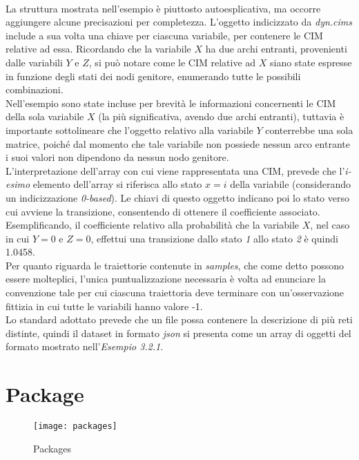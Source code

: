   \paragraph{}
  La struttura mostrata nell'esempio è piuttosto autoesplicativa, ma occorre aggiungere alcune precisazioni
  per completezza. L'oggetto indicizzato da \textit{dyn.cims} include a sua volta una chiave 
  per ciascuna variabile, per contenere le CIM relative ad essa. 
  Ricordando che la variabile $X$ ha due archi entranti, provenienti dalle variabili
  $Y$ e $Z$, si può notare come le CIM relative ad $X$ siano state espresse in funzione
  degli stati dei nodi genitore, enumerando tutte le possibili combinazioni.\\
  Nell'esempio sono state incluse per brevità le informazioni concernenti le CIM della sola
  variabile $X$ (la più significativa, avendo due archi entranti), tuttavia è importante sottolineare che l'oggetto 
  relativo alla variabile $Y$ conterrebbe una sola matrice, poiché dal momento che tale variabile non possiede nessun arco entrante
  i suoi valori non dipendono da nessun nodo genitore.\\
  L'interpretazione dell'array con cui viene rappresentata una CIM, prevede che
  l'\textit{i-esimo} elemento dell'array si riferisca allo stato $x = i$ della variabile (considerando 
  un indicizzazione \textit{0-based}). 
  Le chiavi di questo oggetto indicano poi lo stato verso cui avviene la transizione, 
  consentendo di ottenere il coefficiente associato.\\
  Esemplificando, il coefficiente relativo alla probabilità che la variabile $X$, nel caso in cui $Y=0$ e $Z=0$,
  effettui una transizione dallo stato \textit{1} allo stato \textit{2} è quindi 1.0458.\\
  Per quanto riguarda le traiettorie contenute in \textit{samples}, che come detto 
  possono essere molteplici, l'unica puntualizzazione necessaria è volta ad enunciare la convenzione tale per cui
  ciascuna traiettoria deve terminare con un'osservazione fittizia in cui tutte le variabili hanno valore -1.\\
  Lo standard adottato prevede che un file possa contenere la descrizione di più reti distinte,
  quindi il dataset in formato \textit{json} si presenta come un array di oggetti del formato mostrato 
  nell'\textit{Esempio 3.2.1}.

  \section{Package}
  \begin{figure}[H]
    \texttt{[image: packages]}
    \centering
    \caption{Packages}
  \end{figure}

